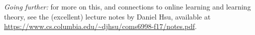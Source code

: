 \begin{framed}
    \noindent\emph{Going further:} for more on this, and connections to online learning and learning theory, see the (excellent) lecture notes by Daniel Hsu, available at \url{https://www.cs.columbia.edu/~djhsu/coms6998-f17/notes.pdf}.
\end{framed}